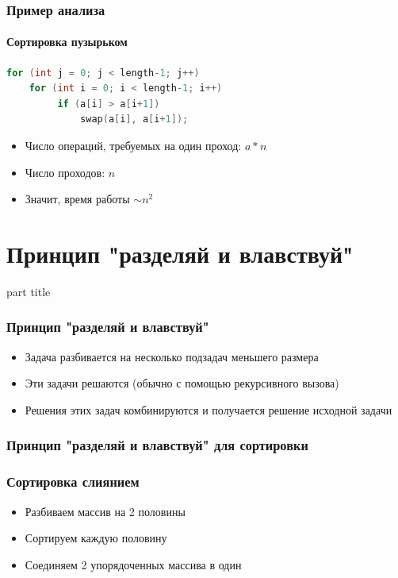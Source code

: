 \documentclass[14pt,pdf,hyperref={unicode}]{beamer}
\begin{document}
\begin{frame}[fragile]
\frametitle{Пример анализа} 
\framesubtitle{Сортировка пузырьком}
\begin{lstlisting}[language=C++,basicstyle=\ttfamily,keywordstyle=\color{blue}]
for (int j = 0; j < length-1; j++)
    for (int i = 0; i < length-1; i++)
         if (a[i] > a[i+1])
             swap(a[i], a[i+1]);
\end{lstlisting}
\begin{itemize}
\item Число операций, требуемых на один проход: $a * n$\\
\item Число проходов: $n$\\
\item Значит, время работы $\sim n^2$\\
\end{itemize}

\end{frame}


\section{Принцип "разделяй и влавствуй"}
\begin{frame}
\begin{center}
\begin{beamercolorbox}[sep=8pt,center]{part
title}
\insertsection
\end{beamercolorbox}
\end{center}
\end{frame}

\begin{frame}[fragile]
\frametitle{Принцип "разделяй и влавствуй"} 
\begin{itemize}
\item Задача разбивается на несколько подзадач меньшего размера \\
\item Эти задачи решаются (обычно с помощью рекурсивного вызова) \\
\item Решения этих задач комбинируются и получается решение исходной задачи \\
\end{itemize}
\end{frame}

\begin{frame}[fragile]
\frametitle{Принцип "разделяй и влавствуй" для сортировки} 
\frametitle{Сортировка слиянием} 
\begin{itemize}
\item Разбиваем массив на 2 половины \\
\item Сортируем каждую половину \\
\item Соединяем 2 упорядоченных массива в один \\
\end{itemize}
\end{frame}
\end{document}

